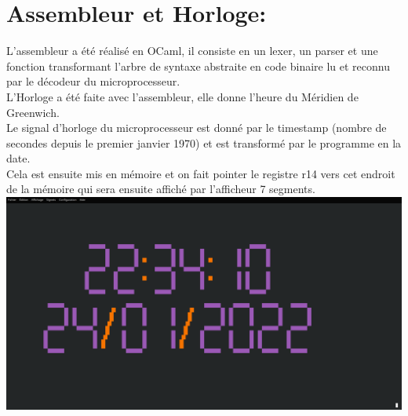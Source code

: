 \documentclass{article}
\begin{document}
		\section{Assembleur et Horloge:}
		L'assembleur a été réalisé en OCaml, il consiste en un lexer, un parser et une fonction transformant l'arbre de syntaxe abstraite en code binaire lu et reconnu par le décodeur du microprocesseur.\\	
		L'Horloge a été faite avec l'assembleur, elle donne l'heure du Méridien de Greenwich.\\
		Le signal d'horloge du microprocesseur est donné par le timestamp (nombre de secondes depuis le premier janvier 1970) et est transformé par le programme en la date.\\
		Cela est ensuite mis en mémoire et on fait pointer le registre r14 vers cet endroit de la mémoire qui sera ensuite affiché par l'afficheur 7 segments.\\
		\includegraphics[scale=0.15]{visuel_horloge.png}
\end{document}

